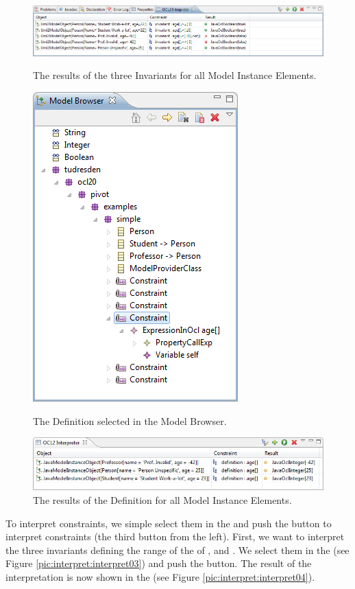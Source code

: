 \begin{figure}[!p]
	\centering
	\includegraphics[width=1.0\linewidth]{figures/interpreter/interpret04}
	\caption{The results of the three Invariants for all Model Instance Elements.}
	\label{pic:interpret:interpret04}

  \vspace{3.0em}

	\centering
	\includegraphics[width=0.4\linewidth]{figures/interpreter/interpret06}
	\caption{The Definition selected in the Model Browser.}
	\label{pic:interpret:interpret06}

  \vspace{3.0em}
  
	\centering
	\includegraphics[width=1.0\linewidth]{figures/interpreter/interpret07}
	\caption{The results of the Definition for all Model Instance Elements.}
	\label{pic:interpret:interpret07}
\end{figure}

To interpret constraints, we simple select them in the  and push the button to interpret constraints (the third button from the left). First, we want to interpret the three invariants defining the range of the  of ,  and . We select them in the  (see Figure \ref{pic:interpret:interpret03}) and push the  button. The result of the interpretation is now shown in the  (see Figure \ref{pic:interpret:interpret04}).

